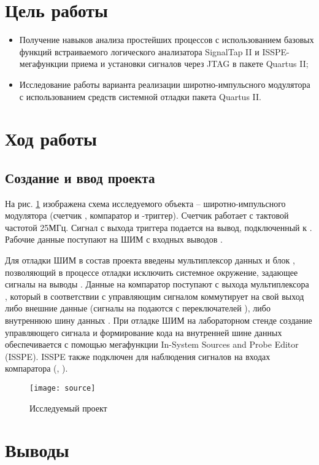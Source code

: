 





\tableofcontents
\newpage

\section{Цель работы}

\begin{itemize}
	\item Получение навыков анализа простейших процессов с использованием базовых функций встраиваемого логического анализатора SignalTap II и ISSPE-мегафункции приема и установки сигналов через JTAG в пакете Quartus II;
	\item Исследование работы варианта реализации широтно-импульсного модулятора с использованием средств системной отладки пакета Quartus II.
\end{itemize}

\section{Ход работы}

\subsection{Создание и ввод проекта}

На рис. \ref{fig:source} изображена схема исследуемого объекта -- широтно-импульсного модулятора (счетчик , компаратор  и -триггер). Счетчик работает с тактовой частотой 25МГц. Сигнал с выхода триггера подается на вывод, подключенный к . Рабочие данные поступают на ШИМ с входных выводов .

Для отладки ШИМ в состав проекта введены мультиплексор данных  и блок , позволяющий в процессе отладки исключить системное окружение, задающее сигналы на выводы . Данные на компаратор поступают с выхода мультиплексора , который в соответствии с управляющим сигналом  коммутирует на свой выход либо внешние данные  (сигналы на  подаются с переключателей ), либо внутреннюю шину данных . При отладке ШИМ на лабораторном стенде создание управляющего сигнала  и формирование кода на внутренней шине данных  обеспечивается с помощью мегафункции In-System Sources and Probe Editor (ISSPE). ISSPE также подключен для наблюдения сигналов на входах компаратора (, ).

\begin{figure}[H]
	\begin{center}
		\texttt{[image: source]}
		\caption{Исследуемый проект}
		\label{fig:source}
	\end{center}
\end{figure}
\vspace{-1cm}

\section{Выводы}



